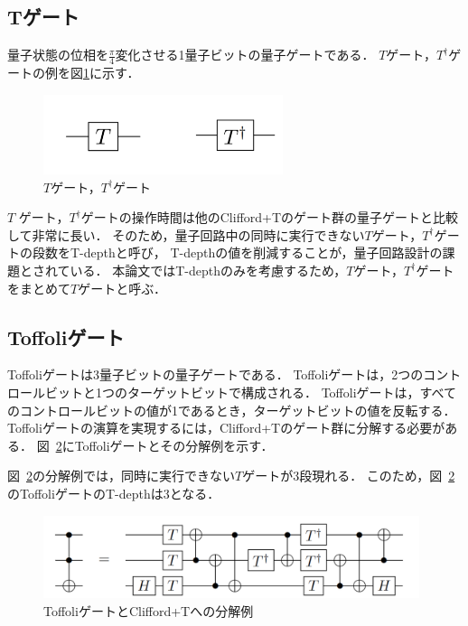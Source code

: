 \subsection{Tゲート}
量子状態の位相を$\frac{\pi}{4}$変化させる1量子ビットの量子ゲートである．
$T$ゲート，$T^{\dag}$ゲートの例を図\ref{T_T_dag}に示す．
\begin{figure}[tbp]
  \centering
  \includegraphics[width=7cm]{img/T_T_dag.pdf}
  \caption{$T$ゲート，$T^{\dag}$ゲート}
  \label{T_T_dag}
\end{figure}
\par
$T$ ゲート，$T^{\dagger}$ゲートの操作時間は他のClifford+Tのゲート群の量子ゲートと比較して非常に長い\cite{fowler2009high}．
そのため，量子回路中の同時に実行できない$T$ゲート，$T^{\dag}$ゲートの段数をT-depth\cite{amy2013meet}と呼び，
T-depthの値を削減することが，量子回路設計の課題とされている．
本論文ではT-depthのみを考慮するため，$T$ゲート，$T^{\dag}$ゲートをまとめて$T$ゲートと呼ぶ．
\subsection{Toffoliゲート}
Toffoliゲートは3量子ビットの量子ゲートである．
Toffoliゲートは，2つのコントロールビットと1つのターゲットビットで構成される．
Toffoliゲートは，すべてのコントロールビットの値が1であるとき，ターゲットビットの値を反転する．
Toffoliゲートの演算を実現するには，Clifford+Tのゲート群に分解する必要がある．
図~\ref{toffoli}にToffoliゲートとその分解例を示す\cite{amy2013meet}．
\par
図~\ref{toffoli}の分解例では，同時に実行できない$T$ゲートが3段現れる．
このため，図~\ref{toffoli}のToffoliゲートのT-depthは3となる．
\begin{figure}[tbp]
  \centering
  \includegraphics[width=11cm]{img/toffoli.pdf}
  \caption{ToffoliゲートとClifford+Tへの分解例\cite{amy2013meet}}
  \label{toffoli}
\end{figure}
